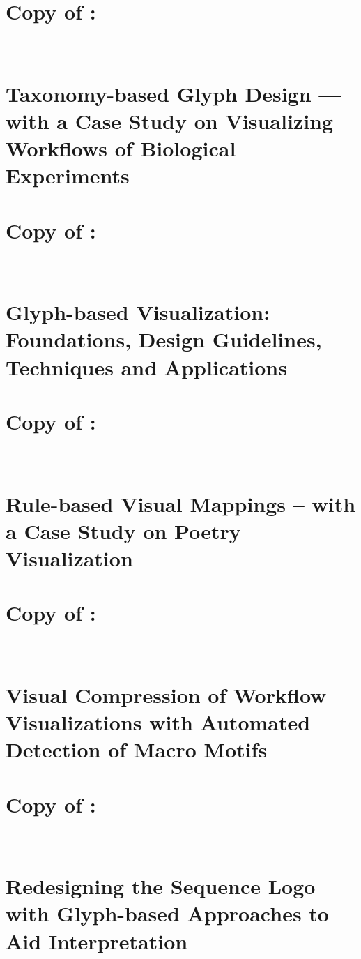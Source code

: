 \documentclass[a4paper]{article}
\begin{document}
\section{Copy of \cite{Maguire:2012:TVCG}:\\~\\~\\Taxonomy-based Glyph Design --- with a Case Study on Visualizing Workflows of Biological Experiments}\label{app:ieee2012}


\section{Copy of \cite{Borgo:2013:EG}:\\~\\~\\Glyph-based Visualization: Foundations, Design Guidelines, Techniques and Applications}\label{app:star13}


\section{Copy of \cite{CGF:Abd2013a}:\\~\\~\\Rule-based Visual Mappings -- with a Case Study on Poetry Visualization}\label{app:poem13}


\section{Copy of \cite{maguire13}:\\~\\~\\Visual Compression of Workflow Visualizations with Automated Detection of Macro Motifs}\label{app:ieee2013}


\section{Copy of \cite{CGF:maguire14-sp}:\\~\\~\\Redesigning the Sequence Logo with Glyph-based Approaches to Aid Interpretation}\label{app:eurovis-sp-14}

\end{document}
